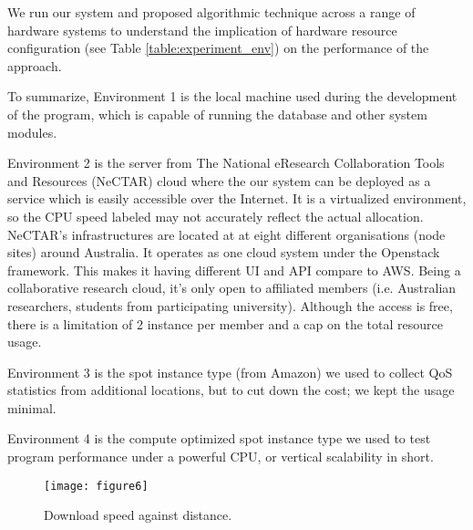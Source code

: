 \documentclass[journal]{IEEEtran}
\begin{document}
We run our system and proposed algorithmic technique across a range of hardware systems to understand the implication of hardware resource configuration (see Table \ref{table:experiment_env}) on the performance of the approach.


To summarize, Environment 1 is the local machine used during the development of the program, which is capable of running the database and other system modules.


Environment 2 is the server from The National eResearch Collaboration Tools and Resources (NeCTAR) cloud \cite{ref40} where the our system can be deployed as a service which is easily accessible over the Internet. It is a virtualized environment, so the CPU speed labeled may not accurately reflect the actual allocation.
NeCTAR's infrastructures are located at at eight different organisations (node sites) around Australia. It operates as one cloud system under the Openstack framework. This makes it having different UI and API compare to AWS. Being a collaborative research cloud, it's only open to affiliated members (i.e. Australian researchers, students from participating university). Although the access is free, there is a limitation of 2 instance per member and a cap on the total resource usage. 


Environment 3 is the spot instance type (from Amazon) we used to collect QoS statistics from additional locations, but to cut down the cost; we kept the usage minimal.


Environment 4 is the compute optimized spot instance type we used to test program performance under a powerful CPU, or vertical scalability in short.

\begin{figure}[!h]
 \centering
 \texttt{[image: figure6]}
 \caption{Download speed against distance.}
\label{fig6}
\end{figure}
 
\end{document}
